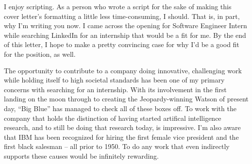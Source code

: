 \documentclass[]{./friggeri-coverletter}
\begin{document}
%
%
%
%
\begin{bp}
I enjoy scripting. As a person who wrote a script for the sake of making this
cover letter's formatting a little less time-consuming, I should. That is, in
part, why I'm writing you now. I came across the opening for Software
Engineer Intern while searching LinkedIn for an internship that would be a fit
for me. By the end of this letter, I hope to make a pretty convincing case for
why I'd be a good fit for the position, as well.
\end{bp}%
%
\begin{bp}
The opportunity to contribute to a company doing innovative,
challenging work while holding itself to high societal standards has been one 
of my primary concerns with searching for an internship. With its involvement
in the first landing on the moon through to creating the Jeopardy-winning 
Watson of present day, ``Big Blue'' has managed to check all of these boxes
off. To work with the company that holds the distinction of having started
artifical intelligence research, and to still be doing that research today, is
impressive. I'm also aware that IBM has been recognized for hiring the first
female vice president and the first black salesman -- all prior to 1950. To do
any work that even indirectly supports these causes would be infinitely
rewarding.
\end{bp}
\end{document}
